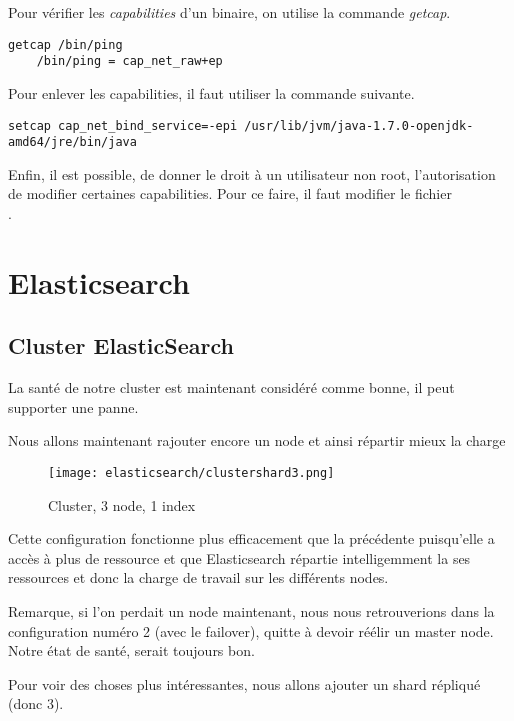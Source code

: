 Pour vérifier les \textit{capabilities} d'un binaire, on utilise la commande 
\emph{getcap}.

\begin{lstlisting}[style=code,label={lst:getcapabilities}]
    getcap /bin/ping
    /bin/ping = cap_net_raw+ep
\end{lstlisting}

Pour enlever les capabilities, il faut utiliser la commande suivante.
\begin{lstlisting}[style=code,label={lst:unsetcapabilities}]
setcap cap_net_bind_service=-epi /usr/lib/jvm/java-1.7.0-openjdk-amd64/jre/bin/java
\end{lstlisting}

Enfin, il est possible, de donner le droit à un utilisateur non root, l'autorisation
de modifier certaines capabilities. Pour ce faire, il faut modifier le fichier \\[1mm]
.

\section{Elasticsearch}
\subsection{Cluster ElasticSearch}
\label{subsec:elasticcluster}

La santé de notre cluster est maintenant considéré comme bonne, il peut supporter 
une panne.

Nous allons maintenant rajouter encore un node et ainsi répartir mieux la charge

\begin{figure}[H]
\center
\texttt{[image: elasticsearch/clustershard3.png]}
\label{fig:clustershard3}
\caption{Cluster, 3 node, 1 index}
\end{figure}

Cette configuration fonctionne plus efficacement que la précédente puisqu'elle a 
accès à plus de ressource et que Elasticsearch répartie intelligemment la ses ressources
et donc la charge de travail sur les différents nodes.

Remarque, si l'on perdait un node maintenant, nous nous retrouverions dans la configuration
numéro 2 (avec le failover), quitte à devoir réélir un master node. Notre état de santé,
serait toujours bon.

Pour voir des choses plus intéressantes, nous allons ajouter un shard répliqué (donc 3).

